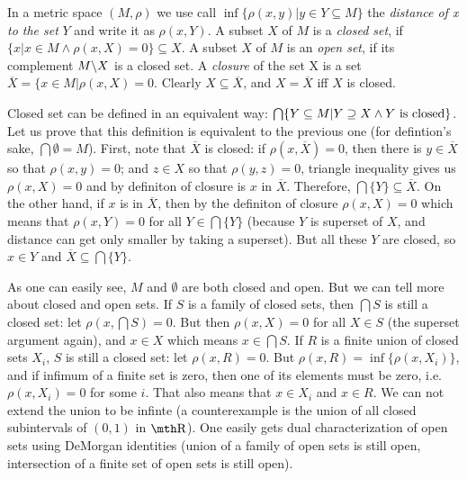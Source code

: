 \bigskip

 In a metric space $(M,\rho)$ we use call $\inf\{
\rho(x,y)|y\in Y\subseteq M\}$ the {\it distance of x to the set} $Y$ and write 
it as $\rho(x,Y)$. A subset $X$ of $M$ is a {\it closed set}, if $\{x|x\in M 
\wedge \rho(x,X) = 0\}\subseteq X$. A subset $X$ of $M$ is an {\it open set}, if 
its complement $M\backslash X$ is a closed set. A {\it closure} of the set X is a 
set $\overline X = \{ x\in M|\rho(x,X)=0$. Clearly $X\subseteq \overline X$, 
and $X = \overline X$ iff $X$ is closed.

\medskip

Closed set can be defined in an equivalent way: $\bigcap\{ Y
\subseteq M| Y\supseteq X \wedge Y\hbox{ is closed}\}$. Let us prove that this
definition is equivalent to the previous one (for defintion's sake, $\bigcap 
\emptyset = M$). First, note that $\overline X$ is closed: if $\rho(x,\overline 
X) = 0$, then there is $y\in \overline X$ so that $\rho(x,y) = 0$; and $z \in 
X$ so that $\rho(y,z) = 0$, triangle inequality gives us $\rho(x,X) = 0$
and by definiton of closure is $x$ in $\overline X$. Therefore, $\bigcap\{Y\}
\subseteq \overline X$. On the other hand, if $x$ is in $\overline X$, then 
by the definiton of closure $\rho(x,X) = 0$ which means that $\rho(x,Y) = 0$ 
for all $Y\in \bigcap\{Y\}$ (because $Y$ is superset of $X$, and distance can 
get only smaller by taking a superset). But all these $Y$ are closed, so $x\in 
Y$ and $\overline X \subseteq \bigcap \{Y\}$.

\medskip

As one can easily see, $M$ and $\emptyset$ are both closed and open. But we 
can tell more about closed and open sets. If $S$ is a family of closed sets,
then $\bigcap S$ is still a closed set: let $\rho(x,\bigcap S)=0$. But then 
$\rho(x,X) = 0$ for all $X\in S$ (the superset argument again), and $x \in 
X$ which means $x\in \bigcap S$. If $R$ is a finite union of closed sets 
$X_i$, $S$ is still a closed set: let $\rho(x,R)=0$. But $\rho(x,R) = 
\inf\{ \rho(x,X_i) \}$, and if infimum of a finite set is zero, then one 
of its elements must be zero, i.e. $\rho(x,X_i) = 0$ for some $i$. That 
also means that $x\in X_i$ and $x\in R$. We can not extend the union to be 
infinte (a counterexample is the union of all closed subintervals of 
$(0,1)$ in $\R$). One easily gets dual characterization of open sets 
using DeMorgan identities (union of a family of open sets is still open, 
intersection of a finite set of open sets is still open).

